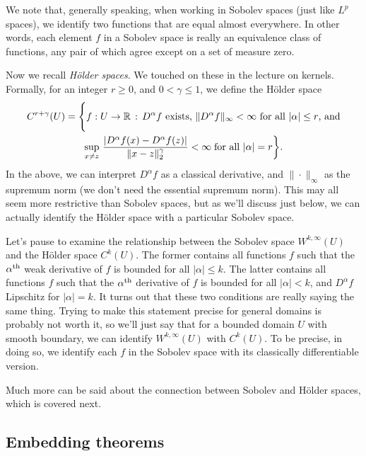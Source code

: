 \documentclass{article}
\begin{document}
We note that, generally speaking, when working in Sobolev spaces (just like
$L^p$ spaces), we identify two functions that are equal almost everywhere. In 
other words, each element $f$ in a Sobolev space is really an equivalence class
of functions, any pair of which agree except on a set of measure zero.

Now we recall \emph{H{\"o}lder spaces}. We touched on these in the lecture on 
kernels. Formally, for an integer $r \geq 0$, and $0 < \gamma \leq 1$, we define
the H{\"o}lder space
\begin{multline*}
C^{r+\gamma}(U) = \Bigg\{ f : U \to \mathbb{R} \,:\, \text{$D^\alpha f$ exists,
  $\|D^\alpha f\|_\infty < \infty$ for all $|\alpha| \leq r$, and} \\   
  \sup_{x \not= z} \, \frac{|D^\alpha f(x) - D^\alpha f(z)|}{\|x-z\|_2^\gamma} < 
  \infty \; \text{for all $|\alpha| = r$} \bigg\}.   
\end{multline*}
In the above, we can interpret $D^\alpha f$ as a classical derivative, and
$\|\cdot\|_\infty$ as the supremum norm (we don't need the essential supremum
norm). This may all seem more restrictive than Sobolev spaces, but as we'll
discuss just below, we can actually identify the H{\"o}lder space with a
particular Sobolev space.       

Let's pause to examine the relationship between the Sobolev space
$W^{k,\infty}(U)$ and the H{\"o}lder space $C^k(U)$. The former contains all
functions $f$ such that the $\alpha^{\text{th}}$ weak derivative of $f$ is bounded for
all $|\alpha| \leq k$. The latter contains all functions $f$ such that the
$\alpha^{\text{th}}$ derivative of $f$ is bounded for all $|\alpha| < k$, and $D^\alpha
f$ Lipschitz for $|\alpha| = k$. It turns out that these two conditions are
really saying the same thing. Trying to make this statement precise for general
domains is probably not worth it, so we'll just say that for a bounded domain
$U$ with smooth boundary, we can identify $W^{k,\infty}(U)$ with $C^k(U)$. To be
precise, in doing so, we identify each $f$ in the Sobolev space with its
classically differentiable version.  


Much more can be said about the connection between Sobolev and H{\"o}lder
spaces, which is covered next.

\subsection{Embedding theorems}
\end{document}
